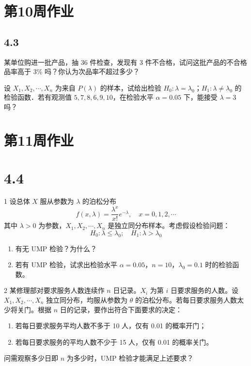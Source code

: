 \section{第10周作业}
\subsection{4.3}
\begin{homework}[1]
某单位购进一批产品，抽 36 件检查，发现有 3 件不合格，试问这批产品的不合格品率高于 3\% 吗？你认为次品率不超过多少？
\end{homework}

\begin{homework}[2]
设 $X_1, X_2, \cdots, X_n$ 为来自 $P(\lambda)$ 的样本，试给出检验 $H_0: \lambda = \lambda_0$；$H_1: \lambda \neq \lambda_0$ 的检验函数．若有观测值 $5, 7, 8, 6, 9, 10$，在检验水平 $\alpha = 0.05$ 下，能接受 $\lambda = 3$ 吗？
\end{homework}
\section{第11周作业}
\section{4.4}
\begin{homework}{1}
设总体 $X$ 服从参数为 $\lambda$ 的泊松分布
$$f(x,\lambda) = \frac{\lambda^x}{x!}e^{-\lambda}, \quad x = 0,1,2,\cdots$$
其中 $\lambda > 0$ 为参数，$X_1, X_2, \cdots, X_n$ 是独立同分布样本。考虑假设检验问题：
$$H_0: \lambda \leq \lambda_0; \quad H_1: \lambda > \lambda_0$$
\begin{enumerate}
    \item 有无 UMP 检验？为什么？
    \item 若有 UMP 检验，试求出检验水平 $\alpha = 0.05$，$n = 10$，$\lambda_0 = 0.1$ 时的检验函数。
\end{enumerate}
\end{homework}
\begin{homework}{2}
某修理部对要求服务人数连续作 $n$ 日记录。$X_i$ 为第 $i$ 日要求服务的人数。设 $X_1, X_2, \cdots, X_n$ 独立同分布，均服从参数为 $\theta$ 的泊松分布。若每日要求服务人数太少将关门。根据 $n$ 日的记录，要作出符合下面要求的决定：
\begin{enumerate}
    \item 若每日要求服务平均人数不多于 10 人，仅有 0.01 的概率开门；
    \item 若每日要求服务的平均人数不少于 15 人，仅有 0.01 的概率关门。
\end{enumerate}
问需观察多少日即 $n$ 为多少时，UMP 检验才能满足上述要求？
\end{homework}

